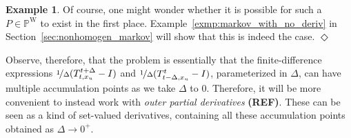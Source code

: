 \documentclass[10pt,a4paper]{paper}
\theoremstyle{definition}
\newtheorem{exmp}{Example}%
\newcommand{\nats}{\mathbb{N}}
\newcommand{\reals}{\mathbb{R}}
\newcommand{\realspos}{\reals_{>0}}
\newcommand{\realsnonneg}{\reals_{\geq 0}}
\newcommand{\states}{\mathcal{X}}
\newcommand{\processes}{\mathbb{P}}
\newcommand{\wprocesses}{\processes^{\mathrm{W}}}
\newcommand{\wmprocesses}{\processes^{\mathrm{WM}}}
\newcommand{\coloneqq}{:\!=}
\newcommand{\exampleend}{\hfill$\Diamond$}
\begin{document}
\begin{exmp}
Of course, one might wonder whether it is possible for such a $P\in\wprocesses$ to exist in the first place. Example~\ref{exmp:markov_with_no_deriv} in Section~\ref{sec:nonhomogen_markov} will show that this is indeed the case.
%
%
\exampleend
\end{exmp}

Observe, therefore, that the problem is essentially that the finite-difference expressions $\nicefrac{1}{\Delta}(T_{t,x_u}^{t+\Delta} - I)$ and $\nicefrac{1}{\Delta}(T_{t-\Delta,x_u}^{t} - I)$, parameterized in $\Delta$, can have multiple accumulation points as we take $\Delta$ to $0$. Therefore, it will be more convenient to instead work with \emph{outer partial derivatives} {\bf (REF)}. These can be seen as a kind of set-valued derivatives, containing all these accumulation points obtained as $\Delta\to0^+$.
\end{document}
